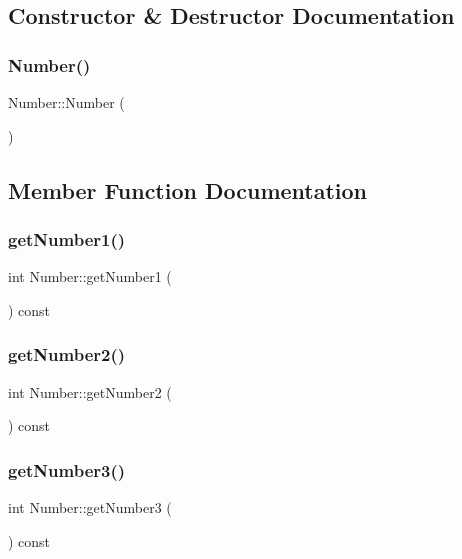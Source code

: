 \subsection{Constructor \& Destructor Documentation}
\mbox{\label{class_number_a5a596a2f86f33fb48493ce0d19e48b34}} 
\subsubsection{Number()}
{\footnotesize\ttfamily Number\+::\+Number (\begin{DoxyParamCaption}{ }\end{DoxyParamCaption})\hspace{0.3cm}{\ttfamily [inline]}}



\subsection{Member Function Documentation}
\mbox{\label{class_number_ab2f73df02df8d8692578870c4fc6e40f}} 
\subsubsection{getNumber1()}
{\footnotesize\ttfamily int Number\+::get\+Number1 (\begin{DoxyParamCaption}{ }\end{DoxyParamCaption}) const}

\mbox{\label{class_number_a85176ca6065e364d16261f36da9c4014}} 
\subsubsection{getNumber2()}
{\footnotesize\ttfamily int Number\+::get\+Number2 (\begin{DoxyParamCaption}{ }\end{DoxyParamCaption}) const}

\mbox{\label{class_number_ae1b115d9ac21df9848e922714c8ee774}} 
\subsubsection{getNumber3()}
{\footnotesize\ttfamily int Number\+::get\+Number3 (\begin{DoxyParamCaption}{ }\end{DoxyParamCaption}) const}

